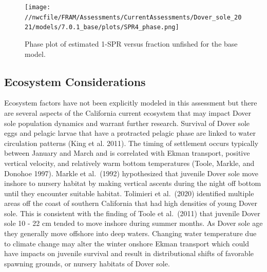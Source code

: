 \documentclass[11pt,
  english,
  a4paper,
]{article}
\begin{document}
\tagmcend\tagstructend


\begin{figure}
\centering
\texttt{[image: //nwcfile/FRAM/Assessments/CurrentAssessments/Dover\_sole\_2021/models/7.0.1\_base/plots/SPR4\_phase.png]}
\caption{Phase plot of estimated 1-SPR versus fraction unfished for the base model.\label{fig:es-phase}}
\end{figure}

\tagmcend\tagstructend

\clearpage


\hypertarget{ecosystem-considerations}{%
\subsection*{Ecosystem Considerations}\label{ecosystem-considerations}}

\leavevmode\tagmcend\tagstructend


Ecosystem factors have not been explicitly modeled in this assessment but there are several aspects of the California current ecosystem that may impact Dover sole population dynamics and warrant further research. Survival of Dover sole eggs and pelagic larvae that have a protracted pelagic phase are linked to water circulation patterns {(King et al. 2011)\leavevmode\tagmcend\tagstructend}. The timing of settlement occurs typically between January and March and is correlated with Ekman transport, positive vertical velocity, and relatively warm bottom temperatures {(Toole, Markle, and Donohoe 1997)\leavevmode\tagmcend\tagstructend}. Markle et al.~{(1992)\leavevmode\tagmcend\tagstructend} hypothesized that juvenile Dover sole move inshore to nursery habitat by making vertical ascents during the night off bottom until they encounter suitable habitat. Tolimieri et al.~{(2020)\leavevmode\tagmcend\tagstructend} identified multiple areas off the coast of southern California that had high densities of young Dover sole. This is consistent with the finding of Toole et al.~{(2011)\leavevmode\tagmcend\tagstructend} that juvenile Dover sole 10 - 22 cm tended to move inshore during summer months. As Dover sole age they generally move offshore into deep waters. Changing water temperature due to climate change may alter the winter onshore Ekman transport which could have impacts on juvenile survival and result in distributional shifts of favorable spawning grounds, or nursery habitats of Dover sole.
\end{document}
